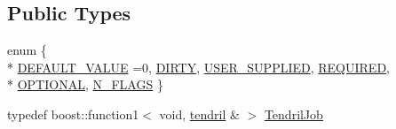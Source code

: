 \subsection*{Public Types}
\begin{DoxyCompactItemize}
\item 
enum \{ \\*
\hyperlink{classecto_1_1tendril_ab63b76909681783917fcb55e3c89f4aca122dd16c5a22a6e22c7caedf7be1d92f}{D\+E\+F\+A\+U\+L\+T\+\_\+\+V\+A\+L\+UE} =0, 
\hyperlink{classecto_1_1tendril_ab63b76909681783917fcb55e3c89f4aca7ae45e8526726df642f14c19db78564d}{D\+I\+R\+TY}, 
\hyperlink{classecto_1_1tendril_ab63b76909681783917fcb55e3c89f4aca26dbd8778d8007b845bb247f6ce87ff8}{U\+S\+E\+R\+\_\+\+S\+U\+P\+P\+L\+I\+ED}, 
\hyperlink{classecto_1_1tendril_ab63b76909681783917fcb55e3c89f4acac686a7ccc1227f1ae09d79536683136b}{R\+E\+Q\+U\+I\+R\+ED}, 
\\*
\hyperlink{classecto_1_1tendril_ab63b76909681783917fcb55e3c89f4aca4906c6f7c63b6934ea683ea05716abee}{O\+P\+T\+I\+O\+N\+AL}, 
\hyperlink{classecto_1_1tendril_ab63b76909681783917fcb55e3c89f4aca8748e76437a722b0cfb3652fefd47d67}{N\+\_\+\+F\+L\+A\+GS}
 \}
\item 
typedef boost\+::function1$<$ void, \hyperlink{classecto_1_1tendril}{tendril} \& $>$ \hyperlink{classecto_1_1tendril_ad312bffc767516bd2340d02cd9e218ae}{Tendril\+Job}
\end{DoxyCompactItemize}
